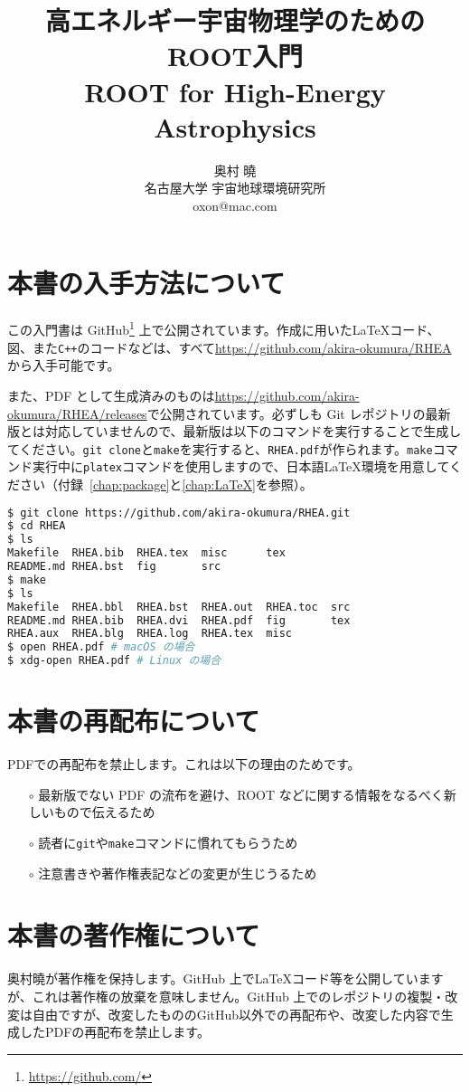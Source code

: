 \documentclass[oneside]{jsbook}
\title{{\huge 高エネルギー宇宙物理学のためのROOT入門\\ROOT for High-Energy Astrophysics}}
\author{{\Large 奥村 曉} \\ 名古屋大学 宇宙地球環境研究所 \\ oxon@mac.com}
\makeatletter
\def\@listoflistenv{[NoFloat][listings][lstlisting]}
\newif\if@expire@floats \@expire@floatsfalse
\def\begin#1{%
   \@ifundefined{#1}%
      {\def\reserved@a{\@latex@error{Environment #1 undefined}\@eha}}%
      {\def\reserved@a{\def\@currenvir{#1}%
          \edef\@currenvline{\on@line}%
          \@check@listenv
          \csname #1\endcsname}}%
       \@ignorefalse
   \begingroup\@endpefalse\reserved@a}
\def\@check@listenv{%
   \@expandtwoargs\in@{[\@currenvir]}{\@listoflistenv}%
   \ifin@ \@expire@floatstrue \fi}
\makeatother
\begin{document}
\maketitle
\frontmatter
\section*{本書の入手方法について}
この入門書は GitHub\footnote{\url{https://github.com/}} 上で公開されています。作成に用いた\LaTeX コード、図、また\texttt{C++}のコードなどは、すべて\url{https://github.com/akira-okumura/RHEA}から入手可能です。

また、PDF として生成済みのものは\url{https://github.com/akira-okumura/RHEA/releases}で公開されています。必ずしも Git レポジトリの最新版とは対応していませんので、最新版は以下のコマンドを実行することで生成してください。\texttt{git clone}と\texttt{make}を実行すると、\texttt{RHEA.pdf}が作られます。\texttt{make}コマンド実行中に\texttt{platex}コマンドを使用しますので、日本語\LaTeX 環境を用意してください（付録~\ref{chap:package}と\ref{chap:LaTeX}を参照）。

\begin{lstlisting}[language=bash]
$ git clone https://github.com/akira-okumura/RHEA.git
$ cd RHEA
$ ls
Makefile  RHEA.bib  RHEA.tex  misc      tex
README.md RHEA.bst  fig       src
$ make
$ ls
Makefile  RHEA.bbl  RHEA.bst  RHEA.out  RHEA.toc  src
README.md RHEA.bib  RHEA.dvi  RHEA.pdf  fig       tex
RHEA.aux  RHEA.blg  RHEA.log  RHEA.tex  misc
$ open RHEA.pdf # macOS の場合
$ xdg-open RHEA.pdf # Linux の場合
\end{lstlisting}

\section*{本書の再配布について}
PDFでの再配布を禁止します。これは以下の理由のためです。
\begin{itemize}
\item[$\circ$]最新版でない PDF の流布を避け、ROOT などに関する情報をなるべく新しいもので伝えるため
\item[$\circ$]読者に\texttt{git}や\texttt{make}コマンドに慣れてもらうため
\item[$\circ$]注意書きや著作権表記などの変更が生じうるため
\end{itemize}

\section*{本書の著作権について}
奥村曉が著作権を保持します。GitHub 上で\LaTeX コード等を公開していますが、これは著作権の放棄を意味しません。GitHub 上でのレポジトリの複製・改変は自由ですが、改変したもののGitHub以外での再配布や、改変した内容で生成したPDFの再配布を禁止します。
\end{document}
